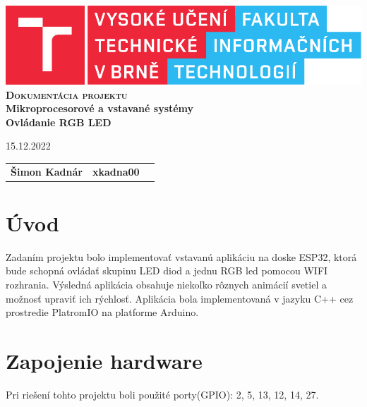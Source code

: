 \documentclass[a4paper, 11pt]{article}
\begin{document}
\begin{titlepage}
\begin{center}
\includegraphics[width=0.77\linewidth]{img/fitlogo1_cz.pdf} \\
\Huge
\textsc{\textbf{Dokumentácia projektu}} \\
\Large\textbf{Mikroprocesorové a vstavané systémy  \\Ovládanie RGB LED} \\
\LARGE

15.12.2022 
\hfill
\begin{tabular}{l l l}
   \textbf{Šimon Kadnár} & \textbf{xkadna00}  \\
\end{tabular}

\end{center}
\end{titlepage}

\section{Úvod}
Zadaním projektu bolo implementovať vstavanú aplikáciu na doske ESP32, ktorá bude schopná ovládať skupinu LED diod a jednu RGB led pomocou WIFI rozhrania. Výsledná aplikácia obsahuje niekoľko rôznych animácií svetiel a možnosť upraviť ich rýchlosť. Aplikácia bola implementovaná v jazyku C++ cez prostredie PlatromIO na platforme Arduino.

\section{Zapojenie hardware}
Pri riešení tohto projektu boli použité porty(GPIO): 2, 5, 13, 12, 14, 27.
\end{document}
